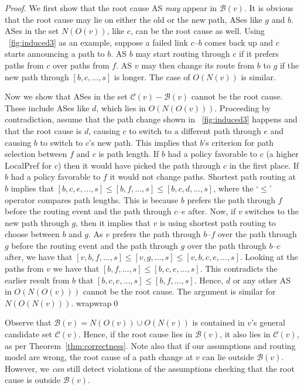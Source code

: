 \begin{proof}

We first show that
the root cause AS \emph{may} appear in $\mathcal{B}(v)$. It is obvious
that the root cause may lie on either the old or the new path, \ie ASes
like $g$ and $b$.  ASes in the set $N(O(v))$, like $c$, can be the root
cause as well.  Using \fig~\ref{fig:induced3} as an example, suppose a failed link $c$--$b$ comes back
up and $c$ starts announcing a path to $b$. AS $b$ may start routing
through $c$ if it prefers paths from $c$ over paths from $f$.  AS $v$
may then change its route from $b$ to $g$ if the new path through $[b,
c, \ldots, s]$ is longer.  The case of $O(N(v))$ is similar.

Now we show that ASes in the set $\mathcal{C}(v) - \mathcal{B}(v)$
cannot be the root cause.  These include ASes like $d$, which lies in
$O(N(O(v)))$.  Proceeding by contradiction, assume that the path change
shown in \fig~\ref{fig:induced3} happens and that the root cause is $d$,
causing $c$ to switch to a different path through $e$ and causing $b$ to
switch to $c$'s new path.  This implies that $b$'s criterion for path
selection between $f$ and $c$ is path length.  If $b$ had a policy
favorable to $c$ (\eg a higher LocalPref for $c$) then it would have
picked the path through $c$ in the first place. If $b$ had a policy
favorable to $f$ it would not change paths. Shortest path routing at
$b$ implies that $[b, c, e, \ldots, s] \leq [b, f, \ldots{}, s] \leq [b,
c, d, \dots{}, s]$, where the `$\leq$' operator compares path lengths.
This is because $b$ prefers the path through $f$ before the routing
event and the path through $c$--$e$ after.  Now, if $v$ switches to the
new path through $g$, then it implies that $v$ is using shortest path
routing to choose between $b$ and $g$.  As $v$ prefers the path through
$b$--$f$ over the path through $g$ before the routing event and the path
through $g$ over the path through $b$--$c$ after, we have that $[v, b,
f, \ldots{}, s] \leq [v, g, \ldots{}, s] \leq [v, b, c, e, \ldots, s]$.
Looking at the paths from $v$ we have that $[b, f, \ldots{}, s] \leq [b,
c, e, \ldots{}, s]$. This contradicts the earlier result from $b$ that
$[b, c, e, \ldots{}, s] \leq [b, f, \ldots{}, s]$.  Hence, $d$ or any
other AS in $O(N(O(v)))$ cannot be the root cause.  The argument is
similar for $N(O(N(v)))$.  {\color{white}wrapwrap}\hfill\qed \end{proof}

Observe that $\mathcal{B}(v) = N(O(v)) \cup O(N(v))$ is contained in
$v$'s general candidate set $\mathcal{C}(v)$.  Hence, if the root cause
lies in $\mathcal{B}(v)$, it also lies in $\mathcal{C}(v)$, as per
Theorem~\ref{thm:correctness}.
Note also that if our assumptions and routing model are wrong, the root cause
of a path change at $v$ can lie outside $\mathcal{B}(v)$.  However, we
\emph{can} still detect violations of the assumptions checking that the
root cause is outside $\mathcal{B}(v)$.

